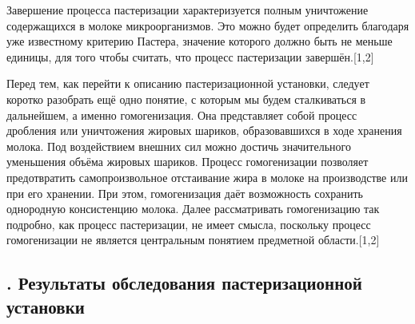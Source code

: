 {  \par \redline Завершение процесса пастеризации характеризуется полным уничтожение содержащихся в молоке микроорганизмов. Это можно будет определить благодаря уже известному критерию Пастера, значение которого должно быть не меньше единицы, для того чтобы считать, что процесс пастеризации завершён.[1,2]

  \par \redline Перед тем, как перейти к описанию пастеризационной установки, следует коротко разобрать ещё одно понятие, с которым мы будем сталкиваться в дальнейшем, а именно гомогенизация. Она представляет собой процесс дробления или уничтожения жировых шариков, образовавшихся в ходе хранения молока. Под воздействием внешних сил можно достичь значительного уменьшения объёма жировых шариков. Процесс гомогенизации позволяет предотвратить самопроизвольное отстаивание жира в молоке на производстве или при его хранении. При этом, гомогенизация даёт возможность сохранить однородную консистенцию молока. Далее рассматривать гомогенизацию так подробно, как процесс пастеризации, не имеет смысла, поскольку процесс гомогенизации не является центральным понятием предметной области.[1,2]

  \par
}

\subtitlespace

\subsection*{ 
  \gostTitleFont
  \redline
  \thechaptercntr .\thesubchaptercntr \spc
  Результаты обследования пастеризационной установки
} \addtocounter{subchaptercntr}{1}

\subtitlespace

